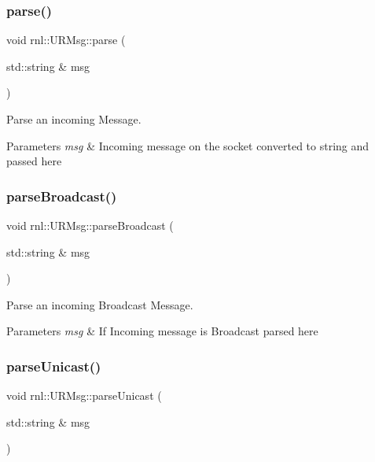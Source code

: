 \subsubsection{\texorpdfstring{parse()}{parse()}}
{\footnotesize\ttfamily void rnl\+::\+U\+R\+Msg\+::parse (\begin{DoxyParamCaption}\item[{std\+::string \&}]{msg }\end{DoxyParamCaption})}



Parse an incoming Message. 


\begin{DoxyParams}{Parameters}
{\em msg} & Incoming message on the socket converted to string and passed here \\
\hline
\end{DoxyParams}
\mbox{\label{structrnl_1_1URMsg_a55d798b7ca94d8b9ab07dadad8331311}} 
\subsubsection{\texorpdfstring{parse\+Broadcast()}{parseBroadcast()}}
{\footnotesize\ttfamily void rnl\+::\+U\+R\+Msg\+::parse\+Broadcast (\begin{DoxyParamCaption}\item[{std\+::string \&}]{msg }\end{DoxyParamCaption})}



Parse an incoming Broadcast Message. 


\begin{DoxyParams}{Parameters}
{\em msg} & If Incoming message is Broadcast parsed here \\
\hline
\end{DoxyParams}
\mbox{\label{structrnl_1_1URMsg_a63005142e2e44009d27f3a5a131b2947}} 
\subsubsection{\texorpdfstring{parse\+Unicast()}{parseUnicast()}}
{\footnotesize\ttfamily void rnl\+::\+U\+R\+Msg\+::parse\+Unicast (\begin{DoxyParamCaption}\item[{std\+::string \&}]{msg }\end{DoxyParamCaption})}




